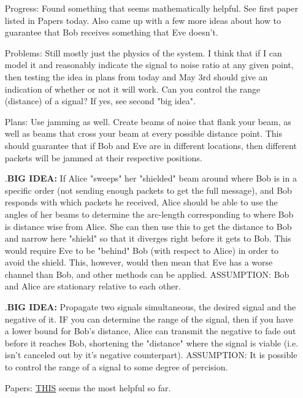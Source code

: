 \documentclass[11pt]{article}
\newcommand{\bigidea}{.\newline\textbf{BIG IDEA:}\newline}
\begin{document}
\begin{itemize}
\item[Progress:]
Found something that seems mathematically helpful.  See first paper listed in Papers today.  Also came up with a few more ideas about how to guarantee that Bob receives something that Eve doesn't.

\item[Problems:]
Still mostly just the physics of the system.  I think that if I can model it and reasonably indicate the signal to noise ratio at any given point, then testing the idea in plans from today and May 3rd should give an indication of whether or not it will work.\newline
Can you control the range (distance) of a signal? If yes, see second "big idea".

\item[Plans:]
Use jamming as well.  Create beams of noise that flank your beam, as well as beams that cross your beam at every possible distance point.  This should guarantee that if Bob and Eve are in different locations, then different packets will be jammed at their respective positions.

\bigidea
If Alice "sweeps" her "shielded" beam around where Bob is in a specific order (not sending enough packets to get the full message), and Bob responds with which packets he received, Alice should be able to use the angles of her beams to determine the arc-length corresponding to where Bob is distance wise from Alice.  She can then use this to get the distance to Bob and narrow here "shield" so that it diverges right before it gets to Bob.  This would require Eve to be "behind" Bob (with respect to Alice) in order to avoid the shield.  This, however, would then mean that Eve has a worse channel than Bob, and other methods can be applied.\newline
ASSUMPTION: Bob and Alice are stationary relative to each other.

\bigidea
Propagate two signals simultaneous, the desired signal and the negative of it.  IF you can determine the range of the signal, then if you have a lower bound for Bob's distance, Alice can transmit the negative to fade out before it reaches Bob, shortening the "distance" where the signal is viable (i.e. isn't canceled out by it's negative counterpart).\newline
ASSUMPTION: It is possible to control the range of a signal to some degree of percision.

\item[Papers:]
\href{https://onlinelibrary.wiley.com/doi/pdf/10.1002/tee.21960}{THIS} seems the most helpful so far.

\end{itemize}
\end{document}
